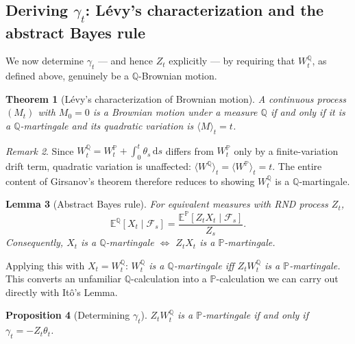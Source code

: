 \documentclass[11pt]{article}
\newtheorem{theorem}{Theorem}[section]
\newtheorem{proposition}[theorem]{Proposition}
\newtheorem{lemma}[theorem]{Lemma}
\theoremstyle{definition}
\theoremstyle{remark}
\newtheorem{remark}[theorem]{Remark}
\newcommand{\dd}{\mathrm{d}}
\newcommand{\E}{\mathbb{E}}
\renewcommand{\P}{\mathbb{P}}
\newcommand{\Q}{\mathbb{Q}}
\newcommand{\F}{\mathcal{F}}
\begin{document}
\subsection{Deriving $\gamma_t$: Lévy's characterization and the abstract Bayes rule}

We now determine $\gamma_t$ — and hence $Z_t$ explicitly — by requiring that $W_t^\Q$, as defined
above, genuinely be a $\Q$-Brownian motion.

\begin{theorem}[Lévy's characterization of Brownian motion]
A continuous process $(M_t)$ with $M_0=0$ is a Brownian motion under a measure $\Q$ if and only if
it is a $\Q$-martingale and its quadratic variation is $\langle M \rangle_t = t$.
\end{theorem}

\begin{remark}
Since $W_t^\Q = W_t^\P + \int_0^t\theta_s\,\dd s$ differs from $W_t^\P$ only by a finite-variation
drift term, quadratic variation is unaffected: $\langle W^\Q\rangle_t = \langle W^\P \rangle_t = t$.
The entire content of Girsanov's theorem therefore reduces to showing $W_t^\Q$ is a $\Q$-martingale.
\end{remark}

\begin{lemma}[Abstract Bayes rule]
For equivalent measures with RND process $Z_t$,
\[
\E^\Q[X_t \mid \F_s] = \frac{\E^\P[Z_tX_t\mid\F_s]}{Z_s}.
\]
Consequently, $X_t$ is a $\Q$-martingale $\iff$ $Z_tX_t$ is a $\P$-martingale.
\end{lemma}

Applying this with $X_t = W_t^\Q$: \emph{$W_t^\Q$ is a $\Q$-martingale iff $Z_tW_t^\Q$ is a
$\P$-martingale.} This converts an unfamiliar $\Q$-calculation into a $\P$-calculation we can carry
out directly with Itô's Lemma.

\begin{proposition}[Determining $\gamma_t$]
\label{prop:gamma}
$Z_tW_t^\Q$ is a $\P$-martingale if and only if $\gamma_t = -Z_t\theta_t$.
\end{proposition}
\end{document}
